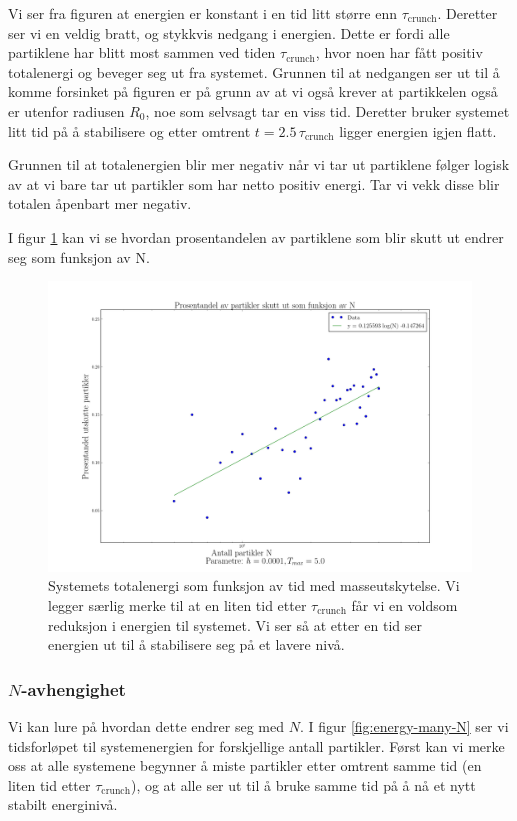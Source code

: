 \documentclass[11pt]{article}
\begin{document}
\begin{multicols}{2}
Vi ser fra figuren at energien er konstant i en tid litt større enn
$\tau_\text{crunch}$. Deretter ser vi en veldig bratt, og stykkvis
nedgang i energien. Dette er fordi alle partiklene har blitt most
sammen ved tiden $\tau_\text{crunch}$, hvor noen har fått positiv
totalenergi og beveger seg ut fra systemet. Grunnen til at nedgangen
ser ut til å komme forsinket på figuren er på grunn av at vi også
krever at partikkelen også er utenfor radiusen $R_0$, noe som selvsagt
tar en viss tid. Deretter bruker systemet litt tid på å stabilisere
og etter omtrent $t = 2.5\,\tau_\text{crunch}$ ligger energien igjen
flatt. 

Grunnen til at totalenergien blir mer negativ når vi tar ut partiklene
følger logisk av at vi bare tar ut partikler som har netto positiv
energi. Tar vi vekk disse blir totalen åpenbart mer negativ. 

I figur
\ref{fig:prosentandel-utskutte} kan vi se hvordan prosentandelen
av partiklene som blir skutt ut endrer seg som funksjon av N. 

\end{multicols}
\begin{figure}[ht!]
  \centering
  \includegraphics[width=\textwidth]{../fig/prosentandel.png}
  \caption{\label{fig:prosentandel-utskutte} Systemets
    totalenergi som funksjon av tid med masseutskytelse. Vi legger
    særlig merke til at en liten tid etter $\tau_\text{crunch}$ får vi
  en voldsom reduksjon i energien til systemet. Vi ser så at etter en
  tid ser energien ut til å stabilisere seg på et lavere nivå.}
\end{figure}
\begin{multicols}{2}

\subsubsection{$N$-avhengighet}
Vi kan lure på hvordan dette endrer seg med $N$. I figur
\ref{fig:energy-many-N} ser vi tidsforløpet til systemenergien for
forskjellige antall partikler. Først kan vi merke oss at alle
systemene begynner å miste partikler etter omtrent samme tid (en liten
tid etter $\tau_\text{crunch}$), og at alle ser ut til å bruke samme
tid på å nå et nytt stabilt energinivå. 

\end{multicols}
\end{document}
